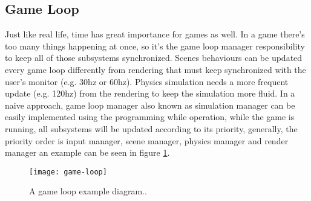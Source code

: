 \subsection{Game Loop}
Just like real life, time has great importance for games as well. In a game there's too many things happening at once, so it's the game loop manager responsibility to keep all of those subsystems synchronized\cite{GameEngineArchitecture, GameProgrammingPatterns}. Scenes behaviours can be updated every game loop differently from rendering that must keep synchronized with the user's monitor (e.g. 30hz or 60hz). Physics simulation needs a more frequent update (e.g. 120hz) from the rendering to keep the simulation more fluid\cite{GameEngineArchitecture}. In a naive approach, game loop manager also known as simulation manager can be easily implemented using the programming while operation, while the game is running, all subsystems will be updated according to its priority, generally, the priority order is input manager, scene manager, physics manager and render manager\cite{GameProgrammingPatterns} an example can be seen in figure \ref{fig:game-loop}.

\begin{figure}[!h] \centering \texttt{[image: game-loop]} \caption{A game loop example diagram.\cite{GameProgrammingPatterns}.} \label{fig:game-loop} \end{figure}
